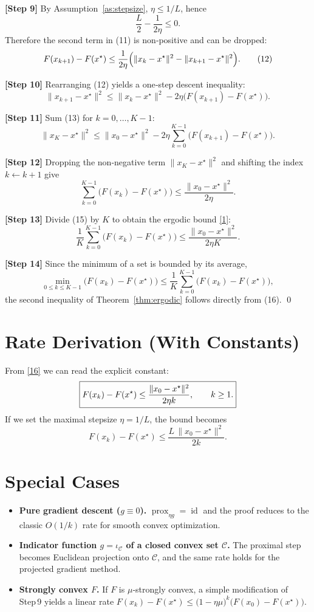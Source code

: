 \documentclass{article}
\newcommand{\prox}{\operatorname{prox}}
\newcommand{\norm}[1]{\|#1\|}
\begin{document}
\noindent\textbf{[Step 9]}  By Assumption~\ref{as:stepsize}, $\eta\le 1/L$, hence
\[
\frac{L}{2}-\frac{1}{2\eta}\le0.
\]
Therefore the second term in (11) is non‑positive and can be dropped:
\[
F(x_{k+1})-F(x^{\star})
\le
\frac{1}{2\eta}\Bigl(\norm{x_{k}-x^{\star}}^{2}
-\norm{x_{k+1}-x^{\star}}^{2}\Bigr).
\tag{12}
\]

\noindent\textbf{[Step 10]}  Rearranging (12) yields a one‑step descent inequality:
\[
\norm{x_{k+1}-x^{\star}}^{2}
\le
\norm{x_{k}-x^{\star}}^{2}
-2\eta\bigl(F(x_{k+1})-F(x^{\star})\bigr).
\tag{13}
\]

\noindent\textbf{[Step 11]}  Sum (13) for $k=0,\dots,K-1$:
\[
\norm{x_{K}-x^{\star}}^{2}
\le
\norm{x_{0}-x^{\star}}^{2}
-2\eta\sum_{k=0}^{K-1}\bigl(F(x_{k+1})-F(x^{\star})\bigr).
\tag{14}
\]

\noindent\textbf{[Step 12]}  Dropping the non‑negative term $\norm{x_{K}-x^{\star}}^{2}$ and shifting the index $k\leftarrow k+1$ give
\[
\sum_{k=0}^{K-1}\bigl(F(x_{k})-F(x^{\star})\bigr)
\le
\frac{\norm{x_{0}-x^{\star}}^{2}}{2\eta}.
\tag{15}
\]

\noindent\textbf{[Step 13]}  Divide (15) by $K$ to obtain the ergodic bound \eqref{1}:
\[
\frac{1}{K}\sum_{k=0}^{K-1}\bigl(F(x_{k})-F(x^{\star})\bigr)
\le
\frac{\norm{x_{0}-x^{\star}}^{2}}{2\eta K}.
\tag{16}
\]

\noindent\textbf{[Step 14]}  Since the minimum of a set is bounded by its average,
\[
\min_{0\le k\le K-1}\bigl(F(x_{k})-F(x^{\star})\bigr)
\le
\frac{1}{K}\sum_{k=0}^{K-1}\bigl(F(x_{k})-F(x^{\star})\bigr),
\]
the second inequality of Theorem~\ref{thm:ergodic} follows directly from (16). \qed

\section*{Rate Derivation (With Constants)}
From \eqref{16} we can read the explicit constant:
\[
\boxed{%
F(x_{k})-F(x^{\star})\le \frac{\norm{x_{0}-x^{\star}}^{2}}{2\eta k},
\qquad k\ge1.}
\]
If we set the maximal stepsize $\eta=1/L$, the bound becomes
\[
F(x_{k})-F(x^{\star})\le \frac{L\,\norm{x_{0}-x^{\star}}^{2}}{2k}.
\]

\section*{Special Cases}
\begin{itemize}
    \item \textbf{Pure gradient descent ($g\equiv0$).}  $\prox_{\eta g}=\operatorname{id}$ and the proof reduces to the classic $O(1/k)$ rate for smooth convex optimization.
    \item \textbf{Indicator function $g=\iota_{\mathcal C}$ of a closed convex set $\mathcal C$.}  The proximal step becomes Euclidean projection onto $\mathcal C$, and the same rate holds for the projected gradient method.
    \item \textbf{Strongly convex $F$.}  If $F$ is $\mu$‑strongly convex, a simple modification of Step 9 yields a linear rate
    $F(x_{k})-F(x^{\star})\le \bigl(1-\eta\mu\bigr)^{k}\bigl(F(x_{0})-F(x^{\star})\bigr)$.
\end{itemize}
\end{document}
